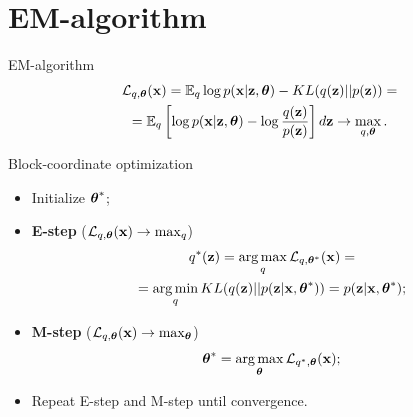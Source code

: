 \documentclass{beamer}
\begin{document}
\section{EM-algorithm}
\begin{frame}{EM-algorithm}
	\vspace{-0.5cm}
	\begin{multline*}
		\mathcal{L}_{q, \boldsymbol{\theta}}(\mathbf{x})  =  \mathbb{E}_{q} \log p(\mathbf{x} | \mathbf{z}, \boldsymbol{\theta}) - KL (q(\mathbf{z}) || p(\mathbf{z})) = \\ = \mathbb{E}_q \left[ \log p(\mathbf{x} | \mathbf{z}, \boldsymbol{\theta}) - \log \frac{q(\mathbf{z})}{p(\mathbf{z})} \right]d\mathbf{z} \rightarrow \max_{q, \boldsymbol{\theta}}.
	\end{multline*}
	\vspace{-0.5cm}
	\begin{block}{Block-coordinate optimization}
		\begin{itemize}
			\item Initialize $\boldsymbol{\theta}^*$;
			\item \textbf{E-step} ($\mathcal{L}_{q, \boldsymbol{\theta}}(\mathbf{x}) \rightarrow \max_q$)
			\vspace{-0.2cm}
			\begin{multline*}
				q^*(\mathbf{z}) = \operatorname*{arg\,max}_q \mathcal{L}_{q, \boldsymbol{\theta}^*}(\mathbf{x}) = \\
				= \operatorname*{arg\,min}_q KL(q(\mathbf{z}) || p(\mathbf{z} | \mathbf{x}, \boldsymbol{\theta}^*)) = p(\mathbf{z}| \mathbf{x}, \boldsymbol{\theta}^*);
			\end{multline*}
			\item \textbf{M-step} ($\mathcal{L}_{q, \boldsymbol{\theta}}(\mathbf{x}) \rightarrow \max_{\boldsymbol{\theta}}$)
			\vspace{-0.2cm}
			\[
			\boldsymbol{\theta}^* = \operatorname*{arg\,max}_{\boldsymbol{\theta}} \mathcal{L}_{q^*, \boldsymbol{\theta}}(\mathbf{x});
			\]
			\vspace{-0.2cm}
			\item Repeat E-step and M-step until convergence.
		\end{itemize}
	\end{block}
\end{frame}
\end{document}
